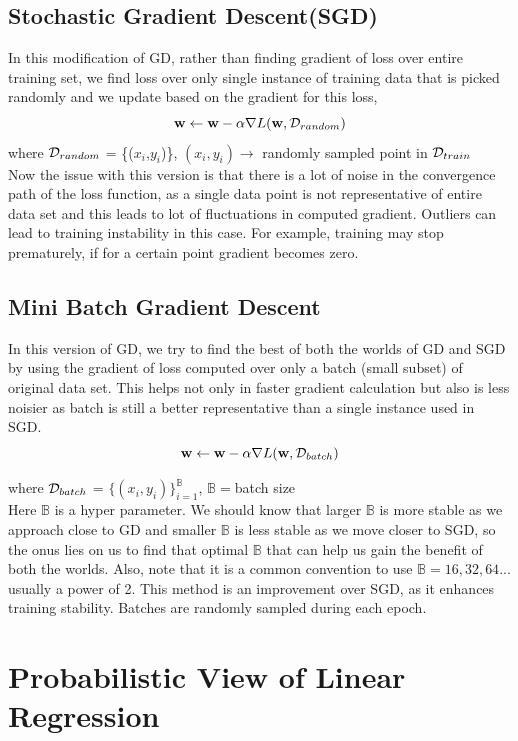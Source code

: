 \subsection{Stochastic Gradient Descent(SGD)}

In this modification of GD, rather than finding gradient of loss over entire training set, we find loss over only single instance of training data that is picked randomly and we update  based on the gradient for this loss,
$$\textbf{w} \leftarrow \textbf{w} - \alpha \nabla L(\textbf{w}, \mathcal{D}_{random})$$
where $\mathcal{D}_{random}$ = \{($x_{i}$,$y_{i}$)\}, $(x_{i},y_{i}) \rightarrow$ randomly sampled point in $\mathcal{D}_{train}$\\
Now the issue with this version is that there is a lot of noise in the convergence path of the loss function, as a single data point is not representative of entire data set and this leads to lot of fluctuations in computed gradient. Outliers can lead to training instability in this
case. For example, training may stop prematurely, if for a certain point gradient becomes
zero.

\subsection{Mini Batch Gradient Descent}
In this version of GD, we try to find the best of both the worlds of GD and SGD by using the gradient of loss computed over only a batch (small subset) of original data set. This helps not only in faster gradient calculation but also is less noisier as batch is still a better representative than a single instance used in SGD.
$$
  \textbf{w} \leftarrow \textbf{w} - \alpha \nabla L(\textbf{w}, \mathcal{D}_{batch})
$$

where $\mathcal{D}_{batch}$ = $\{(x_{i},y_{i})\}_{i = 1}^{\mathbb{B}}$, $\mathbb{B} = $batch size\\
Here $\mathbb{B}$ is a hyper parameter. We should know that larger $\mathbb{B}$ is more stable as we approach close to GD and smaller $\mathbb{B}$ is less stable as we move closer to SGD, so the onus lies on us to find that optimal $\mathbb{B}$ that can help us gain the benefit of both the worlds. Also, note that it is a common convention to use $\mathbb{B} = 16,32,64 ...$ usually a power of 2. This method is an improvement over SGD, as it enhances training
stability. Batches are randomly sampled during each epoch.

\section{Probabilistic View of Linear Regression}

